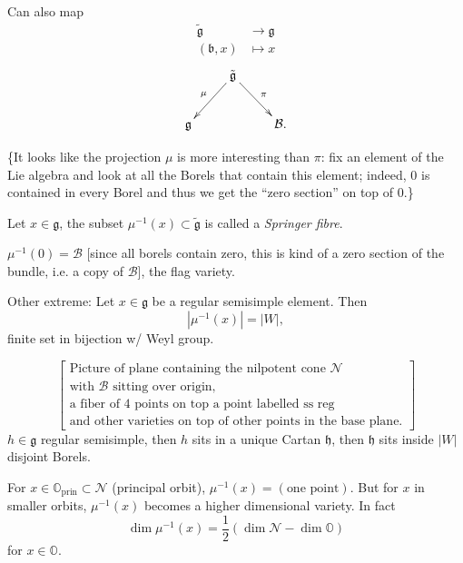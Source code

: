 Can also map
$$
\begin{aligned}\tilde{\mathfrak{g}}
&\longrightarrow \mathfrak{g} \\
(\mathfrak{b},x) &\longmapsto x
\end{aligned}
$$
$$
\xymatrix{
&\tilde{\mathfrak{g}}\ar[dl]_{\mu}\ar[dr]
^{\pi}\\
\mathfrak{g}&&\mathcal{B}.
}
$$

\medskip\noindent
\{It looks like the projection $\mu$
is more interesting than $\pi$: fix an
element of the Lie algebra and look at all
the Borels that contain this element; indeed,
0 is contained in every Borel and thus we get
the ``zero section'' on top of 0.\}

\begin{definition}
\label{definition-springer-fibre}
Let $x \in \mathfrak{g}$, the subset
$\mu^{-1}(x) \subset
\tilde{\mathfrak{g}}$
is called a {\it Springer fibre}.
\end{definition}

\begin{example}
\label{example-flag-variety}
$\mu^{-1}(0)=\mathcal{B}$ [since all borels
contain zero, this is kind of a zero section
of the bundle, i.e. a copy of $\mathcal{B}$],
the flag variety.
\end{example}
Other extreme: Let $x \in \mathfrak{g}$ be a
regular semisimple element. Then
$$
|\mu^{-1}(x)|=|W|,
$$
finite set in bijection w/ Weyl group.

$$
\left[
\substack{\text{Picture of plane containing
the nilpotent cone $\mathcal{N}$} \\
\text{with $\mathcal{B}$ sitting over
origin,}\\
\text{a fiber of 4 points on top a point
labelled ss reg}\\
\text{and other varieties on top of other
points in the base plane.}}\right]
$$
$h \in \mathfrak{g}$ regular semisimple, then
$h$ sits in a unique Cartan $\mathfrak{h}$,
then $\mathfrak{h}$ sits inside $|W|$
disjoint Borels.

\begin{remark}
\label{remark-pincipal-orbit}
For $x \in \mathbb{O}_{\text{prin}}\subset
\mathcal{N}$
(principal orbit), $\mu^{-1}(x)=(\text{one
point})$. But for $x$ in smaller orbits,
$\mu^{-1}(x)$ becomes a higher dimensional
variety. In fact
\begin{equation}
\label{equation-important}
\dim\mu^{-1}(x)=\frac{1}{2}(\dim
\mathcal{N}-\dim \mathbb{O})
\end{equation}
for $x \in \mathbb{O}$.
\end{remark}

